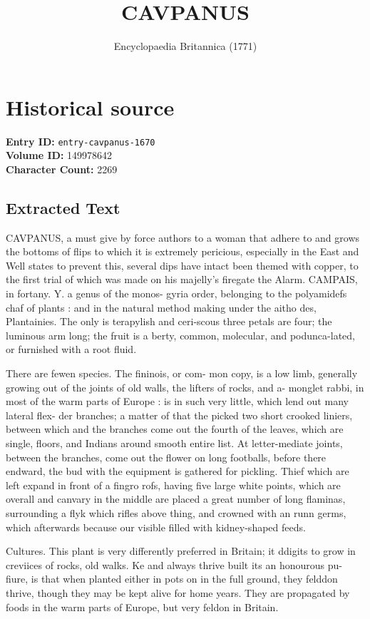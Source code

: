 \documentclass{article}
\title{CAVPANUS}
\date{Encyclopaedia Britannica (1771)}
\begin{document}
\maketitle

\section*{Historical source}
\textbf{Entry ID:} \texttt{entry-cavpanus-1670} \\
\textbf{Volume ID:} 149978642 \\
\textbf{Character Count:} 2269

\subsection*{Extracted Text}
CAVPANUS, a must give by force authors to a woman that adhere to and grows the bottoms of flips to which it is extremely pericious, especially in the East and Well states to prevent this, several dips have intact been themed with copper, to the first trial of which was made on his majelly's firegate the Alarm. CAMPAIS, in fortany. Y. a genus of the monos- gyria order, belonging to the polyamidefs chaf of plants : and in the natural method making under the aitho des, Plantainies. The only is terapylish and ceri-scous three petals are four; the luminous arm long; the fruit is a berty, common, molecular, and podunca-lated, or furnished with a root fluid.

There are fewen species. The fininois, or com- mon copy, is a low limb, generally growing out of the joints of old walls, the lifters of rocks, and a- monglet rabbi, in most of the warm parts of Europe : is in such very little, which lend out many lateral flex- der branches; a matter of that the picked two short crooked liniers, between which and the branches come out the fourth of the leaves, which are single, floors, and Indians around smooth entire list. At letter-mediate joints, between the branches, come out the flower on long footballs, before there endward, the bud with the equipment is gathered for pickling. Thief which are left expand in front of a fingro rofs, having five large white points, which are overall and canvary in the middle are placed a great number of long flaminas, surrounding a flyk which rifles above thing, and crowned with an runn germs, which afterwards because our visible filled with kidney-shaped feeds.

Cultures. This plant is very differently preferred in Britain; it ddigits to grow in creviices of rocks, old walks. Ke and always thrive built its an honourous pu- fiure, is that when planted either in pots on in the full ground, they felddon thrive, though they may be kept alive for home years. They are propagated by foods in the warm parts of Europe, but very feldon in Britain.
\end{document}
